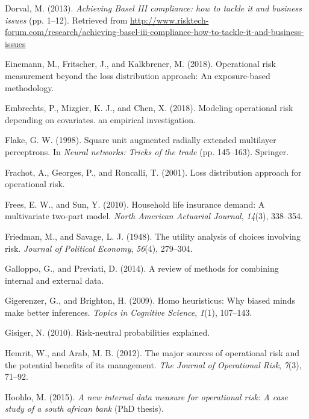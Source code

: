 \documentclass[]{DissertateUSU}
\begin{document}
\hypertarget{ref-mysis2013}{}
Dorval, M. (2013). \emph{Achieving Basel III compliance: how to tackle
it and business issues} (pp. 1--12). Retrieved from
\url{http://www.risktech-forum.com/research/achieving-basel-iii-compliance-how-to-tackle-it-and-business-issues}

\hypertarget{ref-einemann2018operational}{}
Einemann, M., Fritscher, J., and Kalkbrener, M. (2018). Operational risk
measurement beyond the loss distribution approach: An exposure-based
methodology.

\hypertarget{ref-embrechts2018modeling}{}
Embrechts, P., Mizgier, K. J., and Chen, X. (2018). Modeling operational
risk depending on covariates. an empirical investigation.

\hypertarget{ref-flake1998square}{}
Flake, G. W. (1998). Square unit augmented radially extended multilayer
perceptrons. In \emph{Neural networks: Tricks of the trade} (pp.
145--163). Springer.

\hypertarget{ref-frachot2001loss}{}
Frachot, A., Georges, P., and Roncalli, T. (2001). Loss distribution
approach for operational risk.

\hypertarget{ref-frees2010household}{}
Frees, E. W., and Sun, Y. (2010). Household life insurance demand: A
multivariate two-part model. \emph{North American Actuarial Journal},
\emph{14}(3), 338--354.

\hypertarget{ref-friedman1948utility}{}
Friedman, M., and Savage, L. J. (1948). The utility analysis of choices
involving risk. \emph{Journal of Political Economy}, \emph{56}(4),
279--304.

\hypertarget{ref-galloppo2014review}{}
Galloppo, G., and Previati, D. (2014). A review of methods for combining
internal and external data.

\hypertarget{ref-gigerenzer2009homo}{}
Gigerenzer, G., and Brighton, H. (2009). Homo heuristicus: Why biased
minds make better inferences. \emph{Topics in Cognitive Science},
\emph{1}(1), 107--143.

\hypertarget{ref-gisiger2010risk}{}
Gisiger, N. (2010). Risk-neutral probabilities explained.

\hypertarget{ref-hemrit2012major}{}
Hemrit, W., and Arab, M. B. (2012). The major sources of operational
risk and the potential benefits of its management. \emph{The Journal of
Operational Risk}, \emph{7}(3), 71--92.

\hypertarget{ref-hoohlo2015new}{}
Hoohlo, M. (2015). \emph{A new internal data measure for operational
risk: A case study of a south african bank} (PhD thesis).
\end{document}

